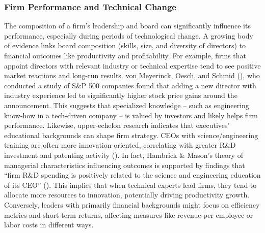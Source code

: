 \documentclass[
]{article}
\begin{document}
\subsubsection{Firm Performance and Technical
Change}\label{firm-performance-and-technical-change}

The composition of a firm's leadership and board can significantly
influence its performance, especially during periods of technological
change. A growing body of evidence links board composition (skills,
size, and diversity of directors) to financial outcomes like
productivity and profitability. For example, firms that appoint
directors with relevant industry or technical expertise tend to see
positive market reactions and long-run results. von Meyerinck, Oesch,
and Schmid
(), who
conducted a study of S\&P 500 companies found that adding a new director
with industry experience led to significantly higher stock price gains
around the announcement. This suggests that specialized knowledge --
such as engineering know-how in a tech-driven company -- is valued by
investors and likely helps firm performance. Likewise, upper-echelon
research indicates that executives' educational backgrounds can shape
firm strategy. CEOs with science/engineering training are often more
innovation-oriented, correlating with greater R\&D investment and
patenting activity
(). In fact, Hambrick \& Mason's theory of managerial
characteristics influencing outcomes is supported by findings that
``firm R\&D spending is positively related to the science and
engineering education of its CEO''\hspace{0pt}
(). This implies that when technical experts lead
firms, they tend to allocate more resources to innovation, potentially
driving productivity growth. Conversely, leaders with primarily
financial backgrounds might focus on efficiency metrics and short-term
returns, affecting measures like revenue per employee or labor costs in
different ways.
\end{document}
